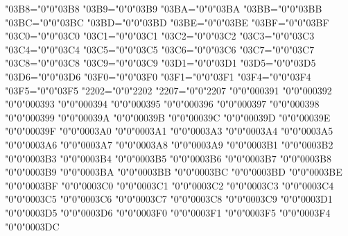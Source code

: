 {    \Umathcode"03B8="0"0"03B8%
    \Umathcode"03B9="0"0"03B9%
    \Umathcode"03BA="0"0"03BA%
    \Umathcode"03BB="0"0"03BB%
    \Umathcode"03BC="0"0"03BC%
    \Umathcode"03BD="0"0"03BD%
    \Umathcode"03BE="0"0"03BE%
    \Umathcode"03BF="0"0"03BF%
    \Umathcode"03C0="0"0"03C0%
    \Umathcode"03C1="0"0"03C1%
    \Umathcode"03C2="0"0"03C2%
    \Umathcode"03C3="0"0"03C3%
    \Umathcode"03C4="0"0"03C4%
    \Umathcode"03C5="0"0"03C5%
    \Umathcode"03C6="0"0"03C6%
    \Umathcode"03C7="0"0"03C7%
    \Umathcode"03C8="0"0"03C8%
    \Umathcode"03C9="0"0"03C9%
    \Umathcode"03D1="0"0"03D1%
    \Umathcode"03D5="0"0"03D5%
    \Umathcode"03D6="0"0"03D6%
    \Umathcode"03F0="0"0"03F0%
    \Umathcode"03F1="0"0"03F1%
    \Umathcode"03F4="0"0"03F4%
    \Umathcode"03F5="0"0"03F5%
    \Umathcode"2202="0"0"2202%
    \Umathcode"2207="0"0"2207%
    \Umathchardef\Alpha     "0"0"000391%
    \Umathchardef\Beta      "0"0"000392%
    \Umathchardef\Gamma     "0"0"000393%
    \Umathchardef\Delta     "0"0"000394%
    \Umathchardef\Epsilon   "0"0"000395%
    \Umathchardef\Zeta      "0"0"000396%
    \Umathchardef\Eta       "0"0"000397%
    \Umathchardef\Theta     "0"0"000398%
    \Umathchardef\Iota      "0"0"000399%
    \Umathchardef\Kappa     "0"0"00039A%
    \Umathchardef\Lambda    "0"0"00039B%
    \Umathchardef\Mu        "0"0"00039C%
    \Umathchardef\Nu        "0"0"00039D%
    \Umathchardef\Xi        "0"0"00039E%
    \Umathchardef\Omicron   "0"0"00039F%
    \Umathchardef\Pi        "0"0"0003A0%
    \Umathchardef\Rho       "0"0"0003A1%
    \Umathchardef\Sigma     "0"0"0003A3%
    \Umathchardef\Tau       "0"0"0003A4%
    \Umathchardef\Upsilon   "0"0"0003A5%
    \Umathchardef\Phi       "0"0"0003A6%
    \Umathchardef\Chi       "0"0"0003A7%
    \Umathchardef\Psi       "0"0"0003A8%
    \Umathchardef\Omega     "0"0"0003A9%
    \Umathchardef\alpha     "0"0"0003B1%
    \Umathchardef\beta      "0"0"0003B2%
    \Umathchardef\gamma     "0"0"0003B3%
    \Umathchardef\delta     "0"0"0003B4%
    \Umathchardef\varepsilon"0"0"0003B5%
    \Umathchardef\zeta      "0"0"0003B6%
    \Umathchardef\eta       "0"0"0003B7%
    \Umathchardef\theta     "0"0"0003B8%
    \Umathchardef\iota      "0"0"0003B9%
    \Umathchardef\kappa     "0"0"0003BA%
    \Umathchardef\lambda    "0"0"0003BB%
    \Umathchardef\mu        "0"0"0003BC%
    \Umathchardef\nu        "0"0"0003BD%
    \Umathchardef\xi        "0"0"0003BE%
    \Umathchardef\omicron   "0"0"0003BF%
    \Umathchardef\pi        "0"0"0003C0%
    \Umathchardef\rho       "0"0"0003C1%
    \Umathchardef\varsigma  "0"0"0003C2%
    \Umathchardef\sigma     "0"0"0003C3%
    \Umathchardef\tau       "0"0"0003C4%
    \Umathchardef\upsilon   "0"0"0003C5%
    \Umathchardef\varphi    "0"0"0003C6%
    \Umathchardef\chi       "0"0"0003C7%
    \Umathchardef\psi       "0"0"0003C8%
    \Umathchardef\omega     "0"0"0003C9%
    \Umathchardef\vartheta  "0"0"0003D1%
    \Umathchardef\phi       "0"0"0003D5%
    \Umathchardef\varpi     "0"0"0003D6%
    \Umathchardef\varkappa  "0"0"0003F0%
    \Umathchardef\varrho    "0"0"0003F1%
    \Umathchardef\epsilon   "0"0"0003F5%
    \Umathchardef\varTheta  "0"0"0003F4%
    \Umathchardef\digamma   "0"0"0003DC%
    \relax
}

